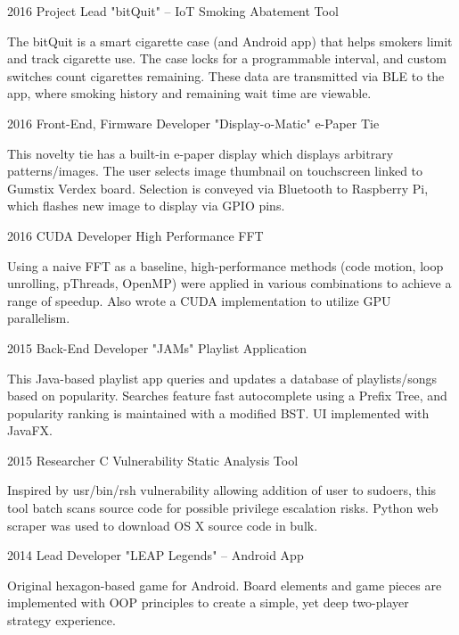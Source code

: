 \documentclass{tccv_AH}
\begin{document}
\begin{eventlist}

\item{2016}
     {Project Lead}
     {"bitQuit" -- IoT Smoking Abatement Tool}

The bitQuit is a smart cigarette case (and Android app) that helps smokers limit and track cigarette use. The case locks for a programmable interval, and custom switches count cigarettes remaining. These data are transmitted via BLE to the app, where smoking history and remaining wait time are viewable.

\item{2016}
     {Front-End, Firmware Developer}
     {"Display-o-Matic" e-Paper Tie}
     
This novelty tie has a built-in e-paper display which displays arbitrary patterns/images. The user selects image thumbnail on touchscreen linked to Gumstix Verdex board. Selection is conveyed via Bluetooth to Raspberry Pi, which flashes new image to display via GPIO pins.

\item{2016}
     {CUDA Developer}
     {High Performance FFT}
     
Using a naive FFT as a baseline, high-performance methods (code motion, loop unrolling, pThreads, OpenMP) were applied in various combinations to achieve a range of speedup. Also wrote a CUDA implementation to utilize GPU parallelism.
     
\item{2015}
     {Back-End Developer}
     {"JAMs" Playlist Application}

This Java-based playlist app queries and updates a database of playlists/songs based on popularity. Searches feature fast autocomplete using a Prefix Tree, and popularity ranking is maintained with a modified BST. UI implemented with JavaFX.

\item{2015}
     {Researcher}
     {C Vulnerability Static Analysis Tool}
    
Inspired by usr/bin/rsh vulnerability allowing addition of user to sudoers, this tool batch scans source code for possible privilege escalation risks. Python web scraper was used to download OS X source code in bulk.

\item{2014}
     {Lead Developer}
     {"LEAP Legends" -- Android App}

Original hexagon-based game for Android. Board elements and game pieces are implemented with OOP principles to create a simple, yet deep two-player strategy experience. 

\end{eventlist}
\end{document}
